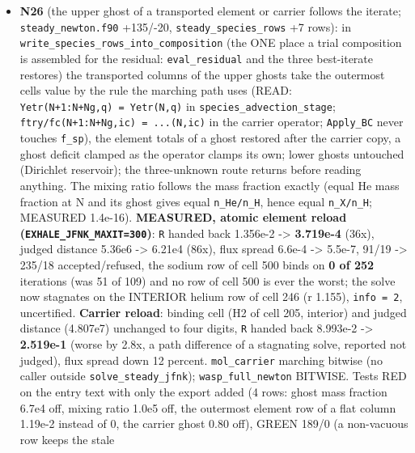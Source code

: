 \documentclass[english,a4paper]{my_memo}
\begin{document}
\begin{itemize}
  distance while the control is \texttt{\textbar{}\textbar{}R\textbar{}\textbar{}} (the two rank iterates differently,
  which limits arm comparisons).
\item
  \textbf{N26} (the upper ghost of a transported element or carrier follows the
  iterate; \texttt{steady\_newton.f90} +135/-20, \texttt{steady\_species\_rows} +7 rows): in
  \texttt{write\_species\_rows\_into\_composition} (the ONE place a trial composition is
  assembled for the residual: \texttt{eval\_residual} and the three best-iterate
  restores) the transported columns of the upper ghosts take the outermost
  cell\textquotesingle s value by the rule the marching path uses (READ: \texttt{Yetr(N+1:N+Ng,q)\ =\ Yetr(N,q)} in \texttt{species\_advection\_stage}; \texttt{ftry/fc(N+1:N+Ng,ic)\ =\ ...(N,ic)}
  in the carrier operator; \texttt{Apply\_BC} never touches \texttt{f\_sp}), the element
  totals of a ghost restored after the carrier copy, a ghost deficit clamped
  as the operator clamps its own; lower ghosts untouched (Dirichlet
  reservoir); the three-unknown route returns before reading anything. The
  mixing ratio follows the mass fraction exactly (equal He mass fraction at
  N and its ghost gives equal \texttt{n\_He/n\_H}, hence equal \texttt{n\_X/n\_H}; MEASURED
  1.4e-16). \textbf{MEASURED, atomic element reload (\texttt{EXHALE\_JFNK\_MAXIT=300})}:
  \texttt{\textbar{}\textbar{}R\textbar{}\textbar{}} handed back 1.356e-2 -\textgreater{} \textbf{3.719e-4} (36x), judged distance
  5.36e6 -\textgreater{} 6.21e4 (86x), flux spread 6.6e-4 -\textgreater{} 5.5e-7, 91/19 -\textgreater{} 235/18
  accepted/refused, the sodium row of cell 500 binds on \textbf{0 of 252}
  iterations (was 51 of 109) and no row of cell 500 is ever the worst; the
  solve now stagnates on the INTERIOR helium row of cell 246 (r 1.155),
  \texttt{info\ =\ 2}, uncertified. \textbf{Carrier reload}: binding cell (H2 of cell 205,
  interior) and judged distance (4.807e7) unchanged to four digits, \texttt{\textbar{}\textbar{}R\textbar{}\textbar{}}
  handed back 8.993e-2 -\textgreater{} \textbf{2.519e-1} (worse by 2.8x, a path difference of a
  stagnating solve, reported not judged), flux spread down 12 percent.
  \texttt{mol\_carrier} marching bitwise (no caller outside \texttt{solve\_steady\_jfnk});
  \texttt{wasp\_full\_newton} BITWISE. Tests RED on the entry text with only the
  export added (4 rows: ghost mass fraction 6.7e4 off, mixing ratio 1.0e5
  off, the outermost element row of a flat column 1.19e-2 instead of 0, the
  carrier ghost 0.80 off), GREEN 189/0 (a non-vacuous row keeps the stale

\end{itemize}
\end{document}
